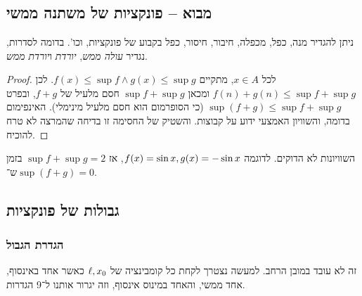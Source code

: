 \documentclass[name=רשימות חשבון דיפרנציאלי ואינטגרלי 1א]{../../../tex/classes/megasumPreamble}
\begin{document}
	
	\section[גבולות]{}
	\subsection{מבוא – פונקציות של משתנה ממשי}
	ניתן להגדיר מנה, כפל, מכפלה, חיבור, חיסור, כפל בקבוע של פונקציות, וכו'.
	בדומה לסדרות, נגדיר \textit{עולה ממש}, \textit{יורדת} ו\textit{יורדת ממש}.


	\begin{proof}
		לכל $x \in A$, מתקיים $f(x) \le \sup f \land g(x) \le \sup g$. לכן $f(n) + g(n) \le \sup f + \sup g$ ומכאן $\sup f + \sup g$ חסם מלעיל של $f + g$, ובפרט $\sup(f + g) \le \sup f + \sup g$ (כי הסופרמום הוא חסם מלעיל מינימלי). האינפימום בדומה, והשוויון האמצעי ידוע על קבוצות. והשטיק של החסימה זו בדיחה שהמרצה לא טרח להוכיח.
	\end{proof}

	השוויונות לא הדוקים. לדוגמה $f(x) = \sin x , g(x) = -\sin x$, אז $\sup f + \sup g = 2$ בזמן ש־$\sup (f + g) = 0$.

	\subsection{גבולות של פונקציות}
	\subsubsection{הגדרת הגבול}
	

	זה לא עובד במובן הרחב. למעשה נצטרך לקחת כל קומבינציה של $\ell, x_0$ כאשר אחד באינסוף, אחד ממשי, והאחד במינוס אינסוף, וזה יגרור אותנו ל־9 הגדרות.
\end{document}
